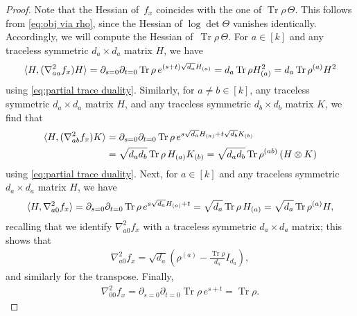 \documentclass[aos]{imsart}
\theoremstyle{definition}
\numberwithin{equation}{section}
\DeclareMathOperator{\tr}{Tr}
\newcommand{\R}{{\mathbb{R}}}
\renewcommand{\H}{{\mathbb{H}}}
\newcommand{\ot}{\otimes}
\begin{document}
\begin{proof}
  Note that the Hessian of~$f_x$ coincides with the one of $\tr\rho\,\Theta$.
  This follows from \cref{eq:obj via rho}, since the Hessian of $\log\det\Theta$ vanishes identically.
  Accordingly, we will compute the Hessian of~$\tr\rho\,\Theta$.
  For $a\in[k]$ and any traceless symmetric $d_a\times d_a$ matrix $H$, we have
  \begin{align*}
    \braket{H, (\nabla^2_{aa} f_x) H}
  = \partial_{s=0} \partial_{t=0} \tr \rho \, e^{(s+t) \sqrt{d_a} H_{(a)}}
  = d_a \tr \rho H_{(a)}^2
  = d_a \tr \rho^{(a)} H^2
  \end{align*}
  using \cref{eq:partial trace duality}.
  Similarly, for $a\neq b\in[k]$, any traceless symmetric $d_a\times d_a$ matrix $H$, and any traceless symmetric $d_b\times d_b$ matrix $K$, we find that
  \begin{align*}
    \braket{H, (\nabla^2_{ab} f_x) K}
  &= \partial_{s=0} \partial_{t=0} \tr \rho \, e^{s \sqrt{d_a} H_{(a)} + t \sqrt{d_b} K_{(b)}} \\
  &= \sqrt{d_a d_b} \tr \rho \, H_{(a)} K_{(b)}
  = \sqrt{d_a d_b} \tr \rho^{(ab)} \left( H \ot K \right)
  \end{align*}
  using \cref{eq:partial trace duality}.
  Next, for $a\in[k]$ and any traceless symmetric $d_a\times d_a$ matrix $H$, we have
  \begin{align*}
    \braket{H, \nabla^2_{a0} f_x}
  = \partial_{s=0} \partial_{t=0} \tr \rho \, e^{s\sqrt{d_a} H_{(a)} + t}
  = \sqrt{d_a} \tr \rho \, H_{(a)}
  = \sqrt{d_a} \tr \rho^{(a)} H,
  \end{align*}
  recalling that we identify $\nabla^2_{a0} f_x$ with a traceless symmetric $d_a\times d_a$ matrix;
  this shows that
  \begin{align*}
    \nabla^2_{a0} f_x = \sqrt{d_a} \left( \rho^{(a)} - \frac{\tr \rho}{d_a} I_{d_a} \right),
  \end{align*}
  and similarly for the transpose.
  Finally,
  \begin{align*}
    \nabla^2_{00} f_x
  = \partial_{s=0} \partial_{t=0} \tr \rho \, e^{s+t}
  = \tr \rho.
  \end{align*}
\end{proof}
\end{document}
